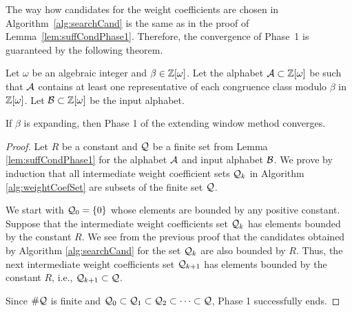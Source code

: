 The way how candidates for the weight coefficients are chosen in Algorithm~\ref{alg:searchCand} is the same as in the proof of Lemma~\ref{lem:suffCondPhase1}. Therefore, the convergence of Phase~1 is guaranteed by the following theorem.
\begin{thm}
\label{thm:suffCondPhase1}
Let $\omega$ be an algebraic integer and $\beta\in\mathbb{Z}[\omega]$. Let the alphabet $\mathcal{A}\subset\mathbb{Z}[\omega]$ be such that $\mathcal{A}$ contains at least one representative of each congruence class modulo $\beta$ in $\mathbb{Z}[\omega]$. Let $\mathcal{B}\subset\mathbb{Z}[\omega]$ be the input alphabet. 

If $\beta$ is expanding, then Phase 1 of the extending window method converges.
\end{thm}
\begin{proof}
Let $R$ be a constant and $\mathcal{Q}$ be a finite set from Lemma \ref{lem:suffCondPhase1} for the alphabet $\mathcal{A}$ and input alphabet $\mathcal{B}$. We prove by induction that  all intermediate weight coefficient sets $\mathcal{Q}_k$ in Algorithm \ref{alg:weightCoefSet} are subsets of the finite set $\mathcal{Q}$. 

We start with $\mathcal{Q}_0=\{0\}$ whose elements are bounded by any positive constant. Suppose that the intermediate weight coefficients set $\mathcal{Q}_k$ has elements bounded by the constant $R$. We see from the previous  proof that the candidates obtained by Algorithm \ref{alg:searchCand} for the set $\mathcal{Q}_k$ are also bounded by $R$. Thus, the next intermediate weight coefficients set $\mathcal{Q}_{k+1}$ has elements bounded by the constant $R$, i.e., $\mathcal{Q}_{k+1}\subset\mathcal{Q}$. 

Since $\#\mathcal{Q}$ is finite and $\mathcal{Q}_0\subset\mathcal{Q}_1\subset\mathcal{Q}_2\subset\cdots\subset\mathcal{Q}$,  Phase 1 successfully ends. 
\end{proof}


